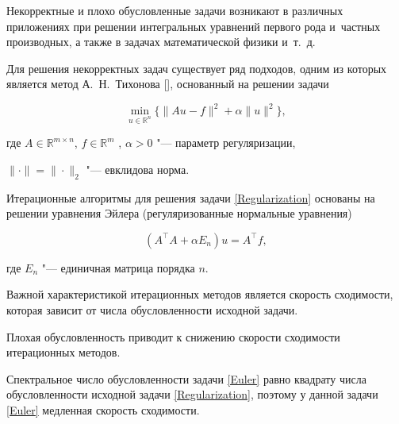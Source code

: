 








\makerutitle




Некорректные и плохо обусловленные задачи возникают в различных приложениях при решении интегральных уравнений первого рода и~частных производных, а также в задачах математической физики и~т.~д. 

Для решения некорректных задач существует ряд подходов, одним из которых является метод А.~Н.~Тихонова [], основанный на решении задачи

\begin{equation}

\min\limits_{u\in \mathbb  R^{n}} \{\|Au-f\|^{2}+\alpha\|u\|^{2}\},

\label{Regularization}

\end{equation}

где $A\in \mathbb R^{m\times n}$, $f\in \mathbb R^{m}$ , $\alpha>0$ "--- параметр регуляризации, 

$\|\cdot\|=\|\cdot\|_{2}$ "--- евклидова норма.



Итерационные алгоритмы для решения задачи \eqref{Regularization} основаны на решении уравнения Эйлера (регуляризованные нормальные уравнения)

\begin{equation}

(A^{\top}A+\alpha E_{n})u=A^{\top}f,

\label{Euler}

\end{equation}

где  $E_{n}$ "--- единичная матрица порядка $n$.



Важной характеристикой итерационных методов является скорость сходимости, которая зависит от числа обусловленности исходной задачи. 

Плохая обусловленность приводит к снижению скорости сходимости итерационных методов. 

Спектральное число обусловленности задачи \eqref{Euler} равно квадрату числа обусловленности исходной задачи \eqref{Regularization}, поэтому у данной задачи \eqref{Euler} медленная скорость сходимости. 

